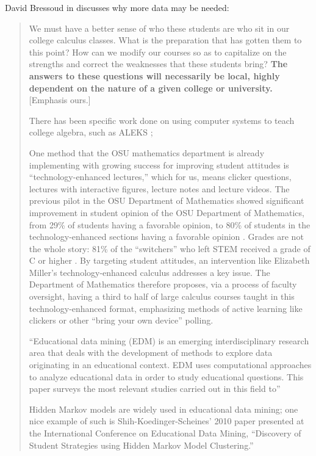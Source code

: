 \documentclass[12pt]{article}
\begin{document}
David Bressoud in \cite{bressoud-sky-falling} discusses why more data may be needed:
\begin{quote}
We must have a better sense of who these students are who sit in our college calculus classes. What is the preparation that has gotten them to this point? How can we modify our courses so as to capitalize on the strengths and correct the weaknesses that these students bring?  \textbf{The answers to these questions will necessarily be local, highly dependent on the nature of a given college or university.}  [Emphasis ours.]

There has been specific work done on using computer systems to teach college algebra, such as ALEKS \parencite{hagerty2005using}; 

One method that the OSU mathematics department is already implementing
with growing success for improving student attitudes is
``technology-enhanced lectures,'' which for us, means clicker
questions, lectures with interactive figures, lecture notes and
lecture videos.  The previous pilot in the OSU Department of
Mathematics showed significant improvement in student opinion of the
OSU Department of Mathematics, from 29\% of students having a
favorable opinion, to 80\% of students in the technology-enhanced
sections having a favorable opinion
\cite{miller-tech-enhanced-calculus}.  Grades are not the whole story:
81\% of the ``switchers'' who left STEM received a grade of C or
higher \cite{calculus-programs}.  By targeting student attitudes, an
intervention like Elizabeth Miller's technology-enhanced calculus
addresses a key issue.  The Department of Mathematics therefore
proposes, via a process of faculty oversight, having a third to half
of large calculus courses taught in this technology-enhanced format,
emphasizing methods of active learning like clickers or other ``bring
your own device'' polling.


``Educational data mining (EDM) is an emerging interdisciplinary research area that deals with the development of methods to explore data originating in an educational context. EDM uses computational approaches to analyze educational data in order to study educational questions. This paper surveys the most relevant studies carried out in this field to'' 

Hidden Markov models are widely used in educational data mining; one
nice example of such is Shih-Koedinger-Scheines' 2010 paper
presented at the International Conference on Educational Data Mining,
``Discovery of Student Strategies using Hidden Markov Model
Clustering.''  \parencite{shihdiscovery}



\end{quote}
\end{document}
